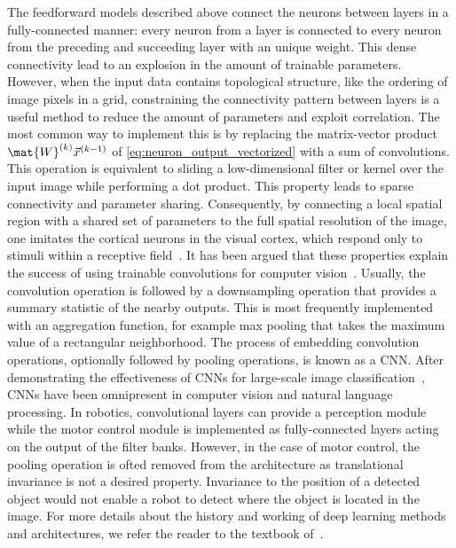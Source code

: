 The feedforward models described above connect the neurons between layers in a fully-connected manner: every neuron from a layer is connected to every neuron from the preceding and succeeding layer with an unique weight. This dense connectivity lead to an explosion in the amount of trainable parameters. However, when the input data contains topological structure, like the ordering of image pixels in a grid, constraining the connectivity pattern between layers is a useful method to reduce the amount of parameters and exploit correlation. The most common way to implement this is by replacing the matrix-vector product $\mat{W}^{(k)} \vec{x}^{(k-1)}$ of \cref{eq:neuron_output_vectorized} with a sum of convolutions. This operation is equivalent to sliding a low-dimensional filter or kernel over the input image while performing a dot product. This property leads to sparse connectivity and parameter sharing. Consequently, by connecting a local spatial region with a shared set of parameters to the full spatial resolution of the image, one imitates the cortical neurons in the visual cortex, which respond only to stimuli within a receptive field~\autocite{hubel1959receptive}. It has been argued that these properties explain the success of using trainable convolutions for computer vision~\autocite{Goodfellow2016}. Usually, the convolution operation is followed by a downsampling operation that provides a summary statistic of the nearby outputs. This is most frequently implemented with an aggregation function, for example max pooling that takes the maximum value of a rectangular neighborhood. The process of embedding convolution operations, optionally followed by pooling operations, is known as a \gls{CNN}. After demonstrating the effectiveness of \glspl{CNN} for large-scale image classification~\autocite{Krizhevsky2012}, \glspl{CNN} have been omnipresent in computer vision and natural language processing. In robotics, convolutional layers can provide a perception module while the motor control module is implemented as fully-connected layers acting on the output of the filter banks. However, in the case of motor control, the pooling operation is ofted removed from the architecture as translational invariance is not a desired property. Invariance to the position of a detected object would not enable a robot to detect where the object is located in the image. For more details about the history and working of deep learning methods and architectures, we refer the reader to the textbook of~\textcite{Goodfellow2016}.
